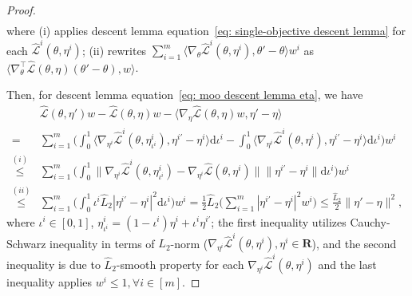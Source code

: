 \documentclass[twoside]{article} %
\def\eqref#1{equation~\ref{#1}}
\theoremstyle{plain}
\theoremstyle{definition}
\theoremstyle{remark}
\newcommand{\hL}{\hat{L}}
\newcommand{\fL}{\mathcal{L}}
\newcommand{\fhL}{\hat{\mathcal{L}}}
\begin{document}
\begin{proof}
\begin{align}
\end{align}
where (i) applies descent lemma \eqref{eq: single-objective descent lemma} for each $\fhL^i({\theta}, \eta^i)$; (ii) rewrites $\sum_{i=1}^{m}\langle\nabla_{{\theta}} {\fhL}^i({\theta}, \eta^i), {\theta}'-{\theta}\rangle w^i$ as $\langle \nabla_{\theta}^{\top}\fhL(\theta, \eta)(\theta'-\theta),w\rangle$. 

Then, for descent lemma \eqref{eq: moo descent lemma eta}, we have
    \begin{align}
         &\fhL(\theta,\eta')w-\fhL(\theta, \eta)w-\langle \nabla_{\eta}\fhL(\theta,\eta)w, \eta'-\eta \rangle \nonumber \\ 
        =& \sum_{i=1}^{m}\Big(\int_{0}^{1}\langle \nabla_{\eta^i} \fhL^i(\theta, \eta^i_{{\iota^i}}), {\eta^{i'}}-\eta^i\rangle \mathrm{d} {\iota}^i - \int_{0}^{1} \langle \nabla_{\eta^i} \fhL^i(\theta, \eta^i), \eta^{i'}-\eta^i\rangle \mathrm{d}{\iota}^i\Big)w^i  \nonumber \\
        \overset{(i)}{\leq}& \sum_{i=1}^{m}
        \Big(\int_{0}^{1}  \|\nabla_{\eta^i} \fhL^i(\theta, \eta^i_{\iota^i})-\nabla_{\eta^i} \fhL(\theta,\eta^i ) \| \|\eta^{i'}-\eta^i \|\mathrm{d}\iota^i \Big) w^i\nonumber \\
        \overset{(ii)}{\leq}& \sum_{i=1}^{m} \Big(\int_{0}^{1} \iota^i \hL_2|\eta^{i'}-\eta^i|^2 \mathrm{d}\iota^i \Big) w^i=\frac{1}{2}\hL_2\Big(\sum_{i=1}^{m}|\eta^{i'}-\eta^i|^2w^i\Big) \leq \frac{\hL_2}{2}\|\eta'-\eta\|^2,\nonumber
    \end{align}
    where $\iota^i\in[0,1]$, $\eta^i_{\iota^i}=(1-\iota^i)\eta^i+\iota^i\eta^{i'}$; the first inequality utilizes Cauchy-Schwarz inequality in terms of $L_2$-norm ($\nabla_{\eta^i}\fhL^i(\theta, \eta^i), \eta^i\in\mathbf{R}$), and the second inequality is due to $\hL_2$-smooth property for each $\nabla_{\eta^i}\fhL^i(\theta, \eta^i)$ and the last inequality applies $w^i\leq 1,\forall i\in[m]$.
\end{proof}
\end{document}

